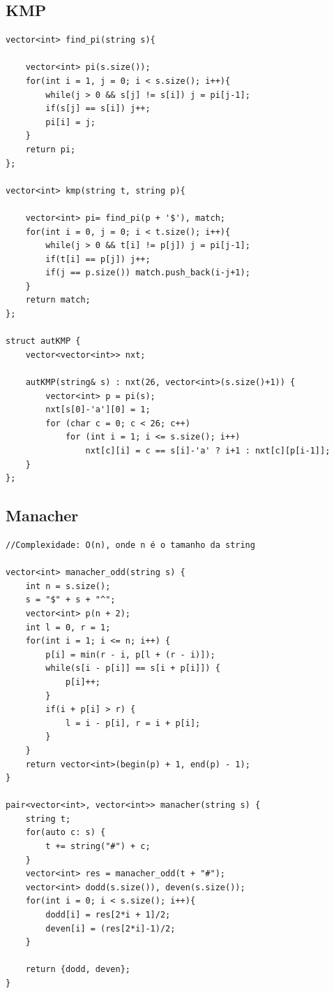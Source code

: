 \documentclass[11pt, a4paper, twoside]{article}
\begin{document}
\subsection{KMP}
\begin{verbatim}
vector<int> find_pi(string s){
    
    vector<int> pi(s.size());
    for(int i = 1, j = 0; i < s.size(); i++){
        while(j > 0 && s[j] != s[i]) j = pi[j-1];
        if(s[j] == s[i]) j++;
        pi[i] = j;
    }
    return pi;
};

vector<int> kmp(string t, string p){
        
    vector<int> pi= find_pi(p + '$'), match;
    for(int i = 0, j = 0; i < t.size(); i++){
        while(j > 0 && t[i] != p[j]) j = pi[j-1];
        if(t[i] == p[j]) j++;
        if(j == p.size()) match.push_back(i-j+1);
    }
    return match;
};

struct autKMP {
    vector<vector<int>> nxt;
    
    autKMP(string& s) : nxt(26, vector<int>(s.size()+1)) {
        vector<int> p = pi(s);
        nxt[s[0]-'a'][0] = 1;
        for (char c = 0; c < 26; c++)
            for (int i = 1; i <= s.size(); i++)
                nxt[c][i] = c == s[i]-'a' ? i+1 : nxt[c][p[i-1]];
    }
};
\end{verbatim}

\subsection{Manacher}
\begin{verbatim}
//Complexidade: O(n), onde n é o tamanho da string

vector<int> manacher_odd(string s) {
    int n = s.size();
    s = "$" + s + "^";
    vector<int> p(n + 2);
    int l = 0, r = 1;
    for(int i = 1; i <= n; i++) {
        p[i] = min(r - i, p[l + (r - i)]);
        while(s[i - p[i]] == s[i + p[i]]) {
            p[i]++;
        }
        if(i + p[i] > r) {
            l = i - p[i], r = i + p[i];
        }
    }
    return vector<int>(begin(p) + 1, end(p) - 1);
}

pair<vector<int>, vector<int>> manacher(string s) {
    string t;
    for(auto c: s) {
        t += string("#") + c;
    }
    vector<int> res = manacher_odd(t + "#");
    vector<int> dodd(s.size()), deven(s.size());
    for(int i = 0; i < s.size(); i++){
        dodd[i] = res[2*i + 1]/2;
        deven[i] = (res[2*i]-1)/2;
    }
    
    return {dodd, deven};
}
\end{verbatim}
\end{document}
